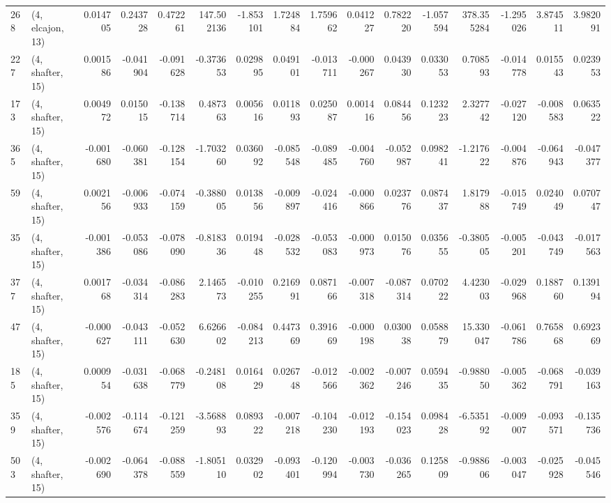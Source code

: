 \begin{tabular}{llrrrrrrrrrrrrrr}
268 &  (4, elcajon, 13) &   0.014705 &  0.243728 &  0.472261 &  147.502136 & -1.853101 &   1.724884 &   1.759662 &  0.041227 &  0.782220 & -1.057594 &  378.355284 & -1.295026 &   3.874511 &   3.982091 \\
227 &  (4, shafter, 15) &   0.001586 & -0.041904 & -0.091628 &   -0.373653 &  0.029895 &   0.049101 &  -0.013711 & -0.000267 &  0.043930 &  0.033053 &    0.708593 & -0.014778 &   0.015543 &   0.023953 \\
173 &  (4, shafter, 15) &   0.004972 &  0.015015 & -0.138714 &    0.487363 &  0.005616 &   0.011893 &   0.025087 &  0.001416 &  0.084456 &  0.123223 &    2.327742 & -0.027120 &  -0.008583 &   0.063522 \\
365 &  (4, shafter, 15) &  -0.001680 & -0.060381 & -0.128154 &   -1.703260 &  0.036092 &  -0.085548 &  -0.089485 & -0.004760 & -0.052987 &  0.098241 &   -1.217622 & -0.004876 &  -0.064943 &  -0.047377 \\
59  &  (4, shafter, 15) &   0.002156 & -0.006933 & -0.074159 &   -0.388005 &  0.013856 &  -0.009897 &  -0.024416 & -0.000866 &  0.023776 &  0.087437 &    1.817988 & -0.015749 &   0.024049 &   0.070747 \\
35  &  (4, shafter, 15) &  -0.001386 & -0.053086 & -0.078090 &   -0.818336 &  0.019448 &  -0.028532 &  -0.053083 & -0.000973 &  0.015076 &  0.035655 &   -0.380505 & -0.005201 &  -0.043749 &  -0.017563 \\
377 &  (4, shafter, 15) &   0.001768 & -0.034314 & -0.086283 &    2.146573 & -0.010255 &   0.216991 &   0.087166 & -0.007318 & -0.087314 &  0.070222 &    4.423003 & -0.029968 &   0.188760 &   0.139194 \\
47  &  (4, shafter, 15) &  -0.000627 & -0.043111 & -0.052630 &    6.626602 & -0.084213 &   0.447369 &   0.391669 & -0.000198 &  0.030038 &  0.058879 &   15.330047 & -0.061786 &   0.765868 &   0.692369 \\
185 &  (4, shafter, 15) &   0.000954 & -0.031638 & -0.068779 &   -0.248108 &  0.016429 &   0.026748 &  -0.012566 & -0.002362 & -0.007246 &  0.059435 &   -0.988050 & -0.005362 &  -0.068791 &  -0.039163 \\
359 &  (4, shafter, 15) &  -0.002576 & -0.114674 & -0.121259 &   -3.568893 &  0.089322 &  -0.007218 &  -0.104230 & -0.012193 & -0.154023 &  0.098428 &   -6.535192 & -0.009007 &  -0.093571 &  -0.135736 \\
503 &  (4, shafter, 15) &  -0.002690 & -0.064378 & -0.088559 &   -1.805110 &  0.032902 &  -0.093401 &  -0.120994 & -0.003730 & -0.036265 &  0.125809 &   -0.988606 & -0.003047 &  -0.025928 &  -0.045546 \\

\end{tabular}
